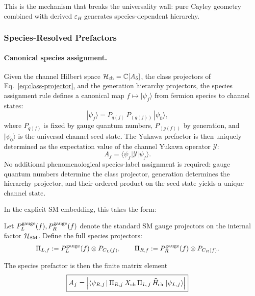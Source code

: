 This is the mechanism that breaks the universality wall: pure Cayley geometry 
combined with derived $\varepsilon_H$ generates species-dependent hierarchy.

\subsubsection{Species-Resolved Prefactors}

\paragraph{Canonical species assignment.}
Given the channel Hilbert space $\mathcal{H}_{\rm ch} = \mathbb{C}[A_5]$, the class projectors of Eq.~\eqref{eq:class-projector}, and the generation hierarchy projectors, the species assignment rule defines a canonical map $f \mapsto |\psi_f\rangle$ from fermion species to channel states:
\begin{equation}\label{eq:species-state-canonical}
|\psi_f\rangle = P_{q(f)}\,P_{(g(f))}\,|\psi_0\rangle,
\end{equation}
where $P_{q(f)}$ is fixed by gauge quantum numbers, $P_{(g(f))}$ by generation, and $|\psi_0\rangle$ is the universal channel seed state.  The Yukawa prefactor is then uniquely determined as the expectation value of the channel Yukawa operator $\mathcal{Y}$:
\begin{equation}\label{eq:Af-canonical}
A_f = \langle\psi_f|\mathcal{Y}|\psi_f\rangle.
\end{equation}
No additional phenomenological species-label assignment is required: gauge quantum numbers determine the class projector, generation determines the hierarchy projector, and their ordered product on the seed state yields a unique channel state.

In the explicit SM embedding, this takes the form:

Let $P^{\rm gauge}_{L}(f), P^{\rm gauge}_{R}(f)$ denote the standard SM gauge projectors
on the internal factor $\mathcal{H}_{\rm SM}$. Define the full species projectors:
\begin{equation}
\Pi_{L,f} := P^{\rm gauge}_{L}(f) \otimes P_{C_L(f)}, \qquad
\Pi_{R,f} := P^{\rm gauge}_{R}(f) \otimes P_{C_R(f)}.
\end{equation}

The species prefactor is then the finite matrix element
\begin{equation}
\boxed{A_f = \Big|\langle \psi_{R,f}|\;\Pi_{R,f}\,X_{\rm ch}\,\Pi_{L,f}\,\widehat{H}_{\rm ch}\;|\psi_{L,f}\rangle\Big|}
\end{equation}

